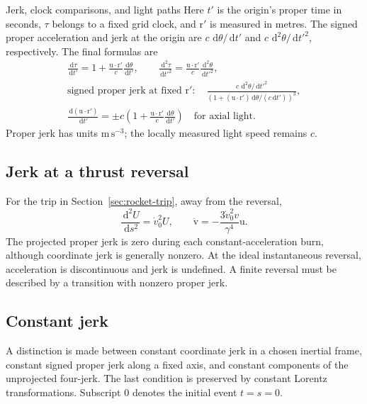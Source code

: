 \documentclass[11pt]{article}
\newcommand{\pv}[1]{{#1}}
\newcommand{\vstyle}[1]{{\bm{\mathrm{#1}}}}
\newcommand{\pU}{\pv{U}}
\numberwithin{equation}{section}
\newcommand{\dotprod}{\cdot}
\newcommand{\br}{\vstyle{r}}
\newcommand{\bv}{\vstyle{v}}
\newcommand{\bu}{\vstyle{u}}
\newcommand{\dd}{\,\mathrm d}
\begin{document}
\begin{SIunits}{Jerk, clock comparisons, and light paths}
Here $t'$ is the origin's proper time in seconds, $\tau$ belongs to a
fixed grid clock, and $\br'$ is measured in metres. The signed proper
acceleration and jerk at the origin are
$c\,\dd\theta/\dd t'$ and $c\,\dd^2\theta/\dd t'^2$, respectively.
The final formulas are
\begin{gather*}
 \frac{\dd\tau}{\dd t'}=1+\frac{\bu\dotprod\br'}{c}\frac{\dd\theta}{\dd t'},
 \qquad
 \frac{\dd^2\tau}{\dd t'^2}
 =\frac{\bu\dotprod\br'}{c}\frac{\dd^2\theta}{\dd t'^2},\\
 \text{signed proper jerk at fixed }\br':\quad
 \frac{c\,\dd^2\theta/\dd t'^2}
 {\left(1+(\bu\dotprod\br')\dd\theta/(c\dd t')\right)^3},\\
 \frac{\dd(\bu\dotprod\br')}{\dd t'}
 =\pm c\left(1+\frac{\bu\dotprod\br'}{c}\frac{\dd\theta}{\dd t'}\right)
 \quad\text{for axial light}.
\end{gather*}
Proper jerk has units $\mathrm{m\,s^{-3}}$; the locally measured light
speed remains $c$.
\end{SIunits}

\subsection{Jerk at a thrust reversal}
\label{sec:reversal-jerk}
For the trip in Section~\ref{sec:rocket-trip}, away from the reversal,
\[
 \frac{\dd^2\pU}{\dd s^2}=\dot v_0^2\pU,\qquad
 \ddot{\bv}=-\frac{3\dot v_0^2v}{\gamma^4}\bu.
\]
The projected proper jerk is zero during each constant-acceleration burn,
although coordinate jerk is generally nonzero. At the ideal instantaneous
reversal, acceleration is discontinuous and jerk is undefined.
A finite reversal must be described by a transition with nonzero proper jerk.

\subsection{Constant jerk}
\label{sec:constant-jerk}
A distinction is made between constant coordinate jerk in a chosen inertial frame,
constant signed proper jerk along a fixed axis, and constant components
of the unprojected four-jerk. The last condition is preserved by constant
Lorentz transformations. Subscript $0$ denotes the initial event $t=s=0$.
\end{document}
